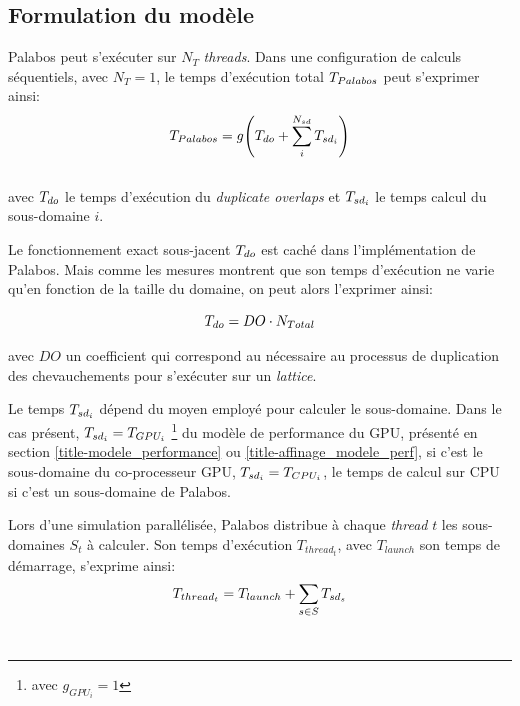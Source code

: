 \subsection{Formulation du modèle}


Palabos peut s'exécuter sur $N_T$ \textit{threads}. Dans une configuration de calculs séquentiels, avec $N_T=1$, le temps d'exécution total $T_{Palabos} $ peut s'exprimer ainsi:
\begin{equation}
T_{Palabos} = g \Bigg(T_{do} + \sum_{i}^{N_{sd}} T_{sd_i} \Bigg) 
\end{equation}\\[-\baselineskip]

avec $T_{do}$ le temps d'exécution du \textit{duplicate overlaps} et $T_{sd_i}$ le temps calcul du sous-domaine $i$.

Le fonctionnement exact sous-jacent $T_{do}$ est caché dans l'implémentation de Palabos. Mais comme les mesures montrent que son temps d'exécution ne varie qu'en fonction de la taille du domaine, on peut alors l'exprimer ainsi:\\

\newcommand{\docoef}[0]{DO}

\begin{equation}
\Time_{do}  = \docoef \cdot N_{Total}
\end{equation}

avec $\docoef$ un coefficient qui correspond au nécessaire au processus de duplication des chevauchements pour s'exécuter sur un \textit{lattice}.

Le temps $T_{sd_i}$ dépend du moyen employé pour calculer le sous-domaine. Dans le cas présent, $T_{sd_i} = T_{GPU_i}$ \footnote{avec $g_{GPU_i}=1$} du modèle de performance du \acs{GPU}, présenté en section \ref{title-modele_performance} ou \ref{title-affinage_modele_perf}, si c'est le sous-domaine du co-processeur \acs{GPU},  $T_{sd_i} = T_{CPU_i}$, le temps de calcul sur \acs{CPU} si c'est un sous-domaine de Palabos.

Lors d'une simulation parallélisée, Palabos distribue à chaque \textit{thread} $t$ les sous-domaines $S_t$ à calculer. Son temps d'exécution $T_{thread_t}$, avec $T_{launch}$ son temps de démarrage, s'exprime ainsi:
\begin{equation}
T_{thread_t} =  T_{launch} + \sum_{s\in S} T_{sd_s} 
\end{equation}\\[-\baselineskip]

